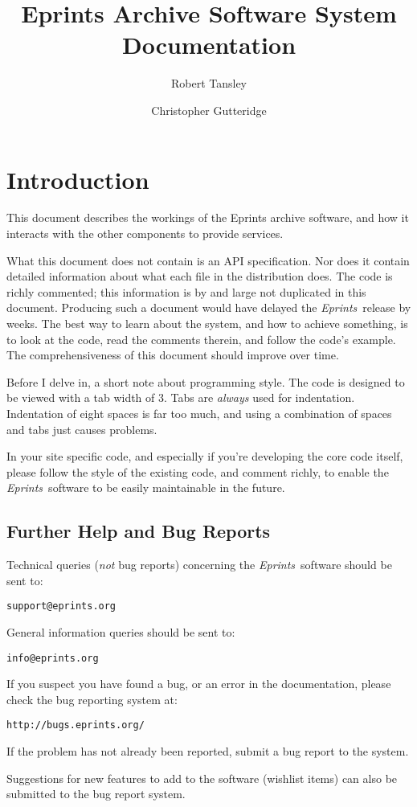 \documentclass[a4paper]{article}
\title{Eprints Archive Software System Documentation}
\author{Robert Tansley \and Christopher Gutteridge}
\newcommand{\eprints}{\emph{Eprints}}
\begin{document}
\maketitle

\tableofcontents

\section{Introduction}

This document describes the workings of the Eprints archive software, and how it interacts with the other components to provide services.

What this document does not contain is an API specification. Nor does it contain detailed information about what each file in the distribution does. The code is richly commented; this information is by and large not duplicated in this document. Producing such a document would have delayed the \eprints\ release by weeks. The best way to learn about the system, and how to achieve something, is to look at the code, read the comments therein, and follow the code's example. The comprehensiveness of this document should improve over time.

Before I delve in, a short note about programming style. The code is designed to be viewed with a tab width of 3. Tabs are \emph{always} used for indentation. Indentation of eight spaces is far too much, and using a combination of spaces and tabs just causes problems.

In your site specific code, and especially if you're developing the core code itself, please follow the style of the existing code, and comment richly, to enable the \eprints\ software to be easily maintainable in the future.

\subsection{Further Help and Bug Reports}

Technical queries (\emph{not} bug reports) concerning the \eprints\ software should be sent to:

\begin{verbatim}
support@eprints.org
\end{verbatim}

General information queries should be sent to:

\begin{verbatim}
info@eprints.org
\end{verbatim}

If you suspect you have found a bug, or an error in the documentation, please check the bug reporting system at:

\begin{verbatim}
http://bugs.eprints.org/
\end{verbatim}

If the problem has not already been reported, submit a bug report to the system.

Suggestions for new features to add to the software (wishlist items) can also be submitted to the bug report system.



\end{document}
